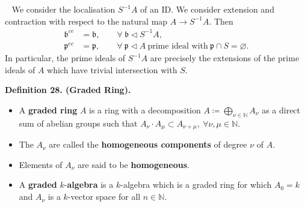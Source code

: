 \documentclass[12pt,a4paper,footinclude=true,headinclude=true]{scrbook} %
\newenvironment{proposition}[2][]
{\renewcommand\theinnercustomprop{#2}\innercustomprop[#1] 
\begin{mdframed}[backgroundcolor=gray!20]\ }
{\end{mdframed}\endinnercustomprop}
\newenvironment{definition}[2][Definition]
    { \begin{mdframed}[backgroundcolor=gray!20] \textbf{#1 #2.}\ }
    {  \end{mdframed}}
\begin{document}
\begin{proposition}{27}
    We consider the localisation $S^{-1}A$ of an ID. We consider extension and contraction with respect to the natural map $A\to S^{-1}A$. Then 
    \begin{align*}
        \mathfrak{b}^{ce} &=\mathfrak{b},\qquad \forall\ \mathfrak{b} \triangleleft S^{-1}A,\\
        \mathfrak{p}^{ec} &=\mathfrak{p},\qquad \forall\ \mathfrak{p} \triangleleft A\ \text{prime ideal with}\ \mathfrak{p}\cap S=\varnothing.
    \end{align*}
    In particular, the prime ideals of $S^{-1}A$ are precisely the extensions of the prime ideals of $A$ which have trivial intersection with $S$.
\end{proposition}

\begin{definition}{28. (Graded Ring)}
    \begin{itemize}
        \item A \textbf{graded ring} $A$ is a ring with a decomposition $A\coloneqq\bigoplus_{\nu\in\mathbb{N}}A_\nu$ as a direct sum of abelian groups such that $A_\nu\cdot A_\mu \subset A_{\nu+\mu},\ \forall\nu,\mu\in\mathbb{N}$.
        \item The $A_\nu$ are called the \textbf{homogeneous components} of degree $\nu$ of $A$.
        \item Elements of $A_\nu$ are said to be \textbf{homogeneous}.
        \item A \textbf{graded} $k$-\textbf{algebra} is a $k$-algebra which is a graded ring for which $A_0=k$ and $A_\nu$ is a $k$-vector space for all $n\in\mathbb{N}$.
    \end{itemize}
\end{definition}
\end{document}
